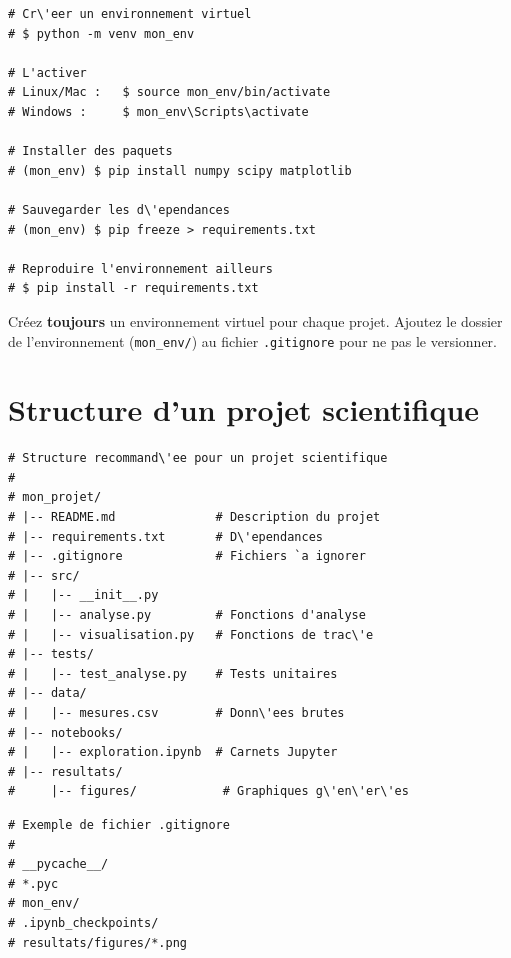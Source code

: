 \begin{codeblock}[title=\textbf{Python}]
\begin{verbatim}
# Cr\'eer un environnement virtuel
# $ python -m venv mon_env

# L'activer
# Linux/Mac :   $ source mon_env/bin/activate
# Windows :     $ mon_env\Scripts\activate

# Installer des paquets
# (mon_env) $ pip install numpy scipy matplotlib

# Sauvegarder les d\'ependances
# (mon_env) $ pip freeze > requirements.txt

# Reproduire l'environnement ailleurs
# $ pip install -r requirements.txt
\end{verbatim}
\end{codeblock}

\begin{bonnepratique}
Cr\'eez \textbf{toujours} un environnement virtuel pour chaque projet.
Ajoutez le dossier de l'environnement (\texttt{mon\_env/}) au fichier
\texttt{.gitignore} pour ne pas le versionner.
\end{bonnepratique}

\section{Structure d'un projet scientifique}

\begin{codeblock}[title=\textbf{Python}]
\begin{verbatim}
# Structure recommand\'ee pour un projet scientifique
#
# mon_projet/
# |-- README.md              # Description du projet
# |-- requirements.txt       # D\'ependances
# |-- .gitignore             # Fichiers `a ignorer
# |-- src/
# |   |-- __init__.py
# |   |-- analyse.py         # Fonctions d'analyse
# |   |-- visualisation.py   # Fonctions de trac\'e
# |-- tests/
# |   |-- test_analyse.py    # Tests unitaires
# |-- data/
# |   |-- mesures.csv        # Donn\'ees brutes
# |-- notebooks/
# |   |-- exploration.ipynb  # Carnets Jupyter
# |-- resultats/
#     |-- figures/            # Graphiques g\'en\'er\'es
\end{verbatim}
\end{codeblock}

\begin{codeblock}[title=\textbf{Python}]
\begin{verbatim}
# Exemple de fichier .gitignore
#
# __pycache__/
# *.pyc
# mon_env/
# .ipynb_checkpoints/
# resultats/figures/*.png
\end{verbatim}
\end{codeblock}


